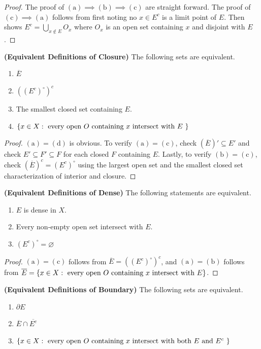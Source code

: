 \documentclass{report}
\begin{document}
\begin{proof}
The proof of $(\text{a})\implies (\text{b})\implies (\text{c})$ are straight forward. The proof of $(\text{c})\implies (\text{a})$ follows from first noting no  $x\in E^c$ is a limit point of $E$. Then shows $E^c = \bigcup_{x \not \in E}O_x$ where $O_x$ is an open set containing $x$ and disjoint with $E$.
\end{proof}
\begin{theorem}
\textbf{(Equivalent Definitions of Closure)} The following sets are equivalent.
\begin{enumerate}[label=(\alph*)]
  \item $\overline{E}$
  \item $((E^c)^\circ )^c$ 
  \item The smallest closed set containing $E$.
  \item $\{ x\in X:\text{ every open $O$ containing $x$ intersect with $E$ } \}$
\end{enumerate}
\end{theorem}
\begin{proof}
$(\text{a})=(\text{d})$ is obvious. To verify $(\text{a})=(\text{c})$, check $(\overline{E})' \subseteq E'$ and check $E'\subseteq F'\subseteq F$ for each closed $F$ containing $E$. Lastly, to verify $(\text{b})=(\text{c})$, check $(\overline{E})^c=(E^c)^\circ $ using the largest open set and the smallest closed set characterization of interior and closure.
\end{proof}
\begin{theorem}
\textbf{(Equivalent Definitions of Dense)} The following statements are equivalent. 
\begin{enumerate}[label=(\alph*)]
  \item $E$ is dense in $X$. 
  \item Every non-empty open set intersect with $E$. 
  \item $(E^c)^\circ =\varnothing$
\end{enumerate}
\end{theorem}
\begin{proof}
$(\text{a})=(\text{c})$ follows from $\overline{E}=((E^c)^\circ )^c$, and $(\text{a})=(\text{b})$ follows from $\overline{E}=\{ x\in X:\text{ every open }O\text{ containing }x\text{ intersect with }E \}$.
\end{proof}
\begin{theorem}
\textbf{(Equivalent Definitions of Boundary)} The following sets are equivalent.
\begin{enumerate}[label=(\alph*)]
  \item $\partial E$
  \item $\overline{E}\cap \overline{E^c}$
  \item $\{ x \in X:\text{ every open $O$ containing $x$ intersect with both $E$ and $E^c$ } \}$
\end{enumerate}
\end{theorem}
\end{document}
